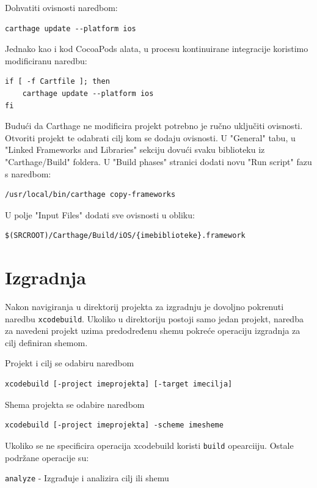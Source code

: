\documentclass[times, utf8, diplomski, numeric]{fer}
\begin{document}
\begin{appendices}
Dohvatiti ovisnosti naredbom:
\begin{verbatim}
carthage update --platform ios
\end{verbatim}

Jednako kao i kod CocoaPods alata, u procesu kontinuirane integracije koristimo modificiranu naredbu:

\begin{verbatim}
if [ -f Cartfile ]; then
    carthage update --platform ios
fi
\end{verbatim}


Budući da Carthage ne modificira projekt potrebno je ručno uključiti ovisnosti. Otvoriti projekt te odabrati cilj kom se dodaju ovisnosti. U "General" tabu, u "Linked Frameworks and Libraries" sekciju dovući svaku biblioteku iz "Carthage/Build" foldera. U "Build phases" stranici dodati novu  "Run script" fazu s naredbom:
\begin{verbatim}
/usr/local/bin/carthage copy-frameworks
\end{verbatim}

U polje "Input Files" dodati sve ovisnosti u obliku:
\begin{verbatim}
$(SRCROOT)/Carthage/Build/iOS/{imebiblioteke}.framework
\end{verbatim}


\section{Izgradnja}

Nakon navigiranja u direktorij projekta za izgradnju je dovoljno pokrenuti naredbu \verb|xcodebuild|. Ukoliko u direktoriju postoji samo jedan projekt, naredba za navedeni projekt uzima predodređenu shemu pokreće operaciju izgradnja za cilj definiran shemom.

Projekt i cilj se odabiru naredbom
\begin{verbatim}
xcodebuild [-project imeprojekta] [-target imecilja]
\end{verbatim}

Shema projekta se odabire naredbom
\begin{verbatim}
xcodebuild [-project imeprojekta] -scheme imesheme
\end{verbatim}

Ukoliko se ne specificira operacija xcodebuild koristi \verb|build| opearciiju. Ostale podržane operacije su:

\verb|analyze| - Izgrađuje i analizira cilj ili shemu


\end{appendices}
\end{document}
